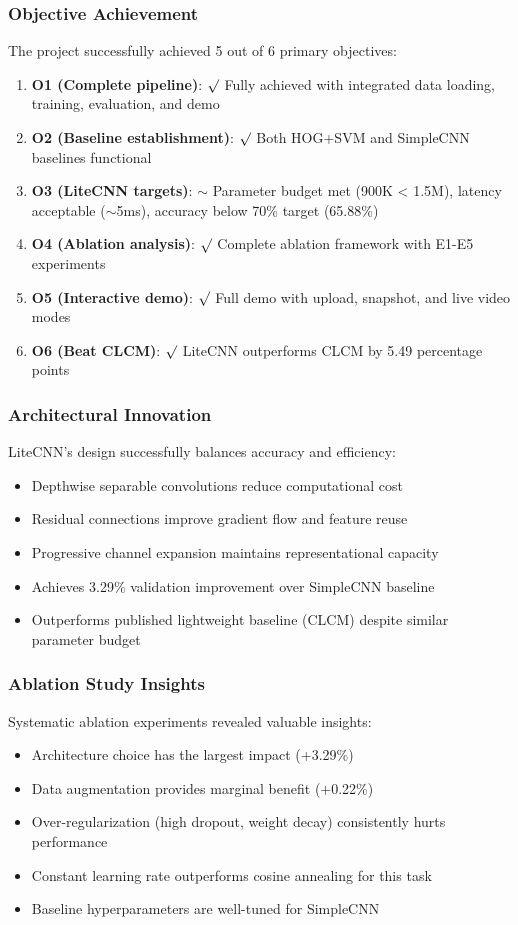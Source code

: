 \documentclass[12pt,a4paper]{article}
\begin{document}
\subsubsection{Objective Achievement}
The project successfully achieved 5 out of 6 primary objectives:
\begin{enumerate}
    \item \textbf{O1 (Complete pipeline)}: $\surd$ Fully achieved with integrated data loading, training, evaluation, and demo
    \item \textbf{O2 (Baseline establishment)}: $\surd$ Both HOG+SVM and SimpleCNN baselines functional
    \item \textbf{O3 (LiteCNN targets)}: $\sim$ Parameter budget met (900K < 1.5M), latency acceptable ($\sim$5ms), accuracy below 70\% target (65.88\%)
    \item \textbf{O4 (Ablation analysis)}: $\surd$ Complete ablation framework with E1-E5 experiments
    \item \textbf{O5 (Interactive demo)}: $\surd$ Full demo with upload, snapshot, and live video modes
    \item \textbf{O6 (Beat CLCM)}: $\surd$ LiteCNN outperforms CLCM by 5.49 percentage points
\end{enumerate}

\subsubsection{Architectural Innovation}
LiteCNN's design successfully balances accuracy and efficiency:
\begin{itemize}[leftmargin=*]
    \item Depthwise separable convolutions reduce computational cost
    \item Residual connections improve gradient flow and feature reuse  
    \item Progressive channel expansion maintains representational capacity
    \item Achieves 3.29\% validation improvement over SimpleCNN baseline
    \item Outperforms published lightweight baseline (CLCM) despite similar parameter budget
\end{itemize}

\subsubsection{Ablation Study Insights}
Systematic ablation experiments revealed valuable insights:
\begin{itemize}[leftmargin=*]
    \item Architecture choice has the largest impact (+3.29\%)
    \item Data augmentation provides marginal benefit (+0.22\%)
    \item Over-regularization (high dropout, weight decay) consistently hurts performance
    \item Constant learning rate outperforms cosine annealing for this task
    \item Baseline hyperparameters are well-tuned for SimpleCNN
\end{itemize}
\end{document}
